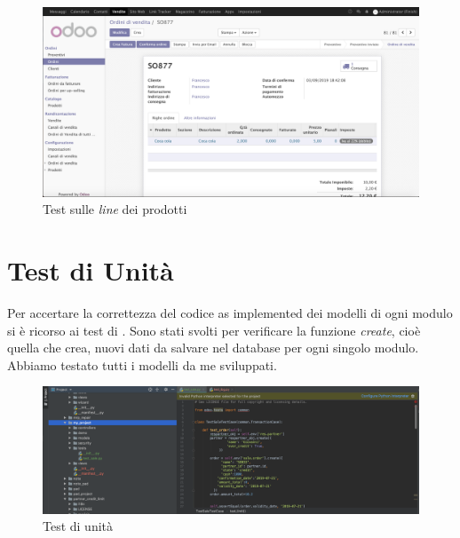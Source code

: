 \begin{figure}[H]
	\begin{center} \includegraphics[scale=0.3]{figures/ctrl_test}
		\caption[Test sulle \textit{line} dei prodotti]{Test sulle \textit{line} dei prodotti}
		\label{fig:ctrl_test}
	\end{center}
\end{figure}
\newpage

\section{Test di Unità}

Per accertare la correttezza del codice as implemented dei modelli di ogni modulo si è ricorso ai test di .
Sono stati svolti per verificare la funzione \textit{create}, cioè quella che crea, nuovi dati da salvare nel database per ogni singolo modulo.\\
Abbiamo testato tutti i modelli da me sviluppati.

\begin{figure}[H]
	\begin{center} \includegraphics[scale=0.3]{figures/unit_test}
		\caption[Test di unità]{Test di unità}
		\label{fig:unit_test}
	\end{center}
\end{figure}
